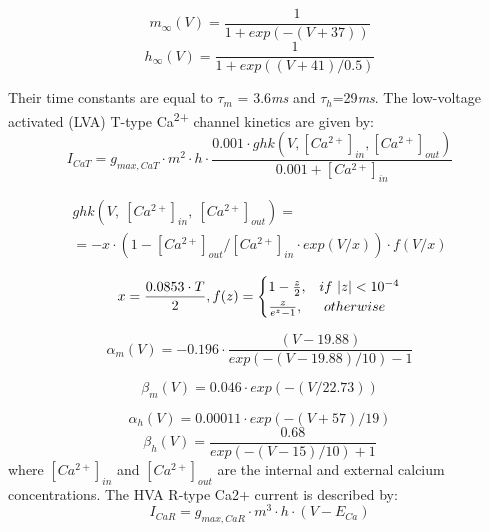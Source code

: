 \documentclass[a4paper,12pt]{article}
\begin{document}
\begin{equation}
m_{\infty}(V)=\frac {1}{1+exp(-(V+37))}
\end{equation}
\begin{equation}
h_{\infty}(V)=\frac {1}{1+exp( (V+41)/0.5)}
\end{equation}

Their time constants are equal to $\tau_m$ = 3.6\textit{ms} and $\tau_h$=29\textit{ms}. The low-voltage activated (LVA) T-type Ca\textsuperscript{2+} channel kinetics are given by:
\begin{equation}
I_{CaT} = g_{max, CaT}\cdot m^2\cdot h \cdot \frac{0.001 \cdot ghk(V,[Ca^{2+}]_{in},[Ca^{2+}]_{out})}{0.001+[Ca^{2+}]_{in} }
\end{equation}

\begin{eqnarray}
ghk(V,\ [Ca^{2+}]_{in},\ [Ca^{2+}]_{out}) = \nonumber \\
= -x\cdot (1 - [Ca^{2+}]_{out}/[Ca^{2+}]_{in} \cdot exp(V/x)) \cdot f(V/x)
\end{eqnarray}

\begin{equation}
x=\frac{0.0853\cdot T}{2}, \\
f(z) = \begin{cases} 1-\frac {z}{2}, & if \ |z|<10^{-4} \\ \frac z{e^z-1}, & \  otherwise \ \end{cases}
\end{equation}

\begin{equation}
\alpha_m(V)=-0.196\cdot \frac{(V-19.88)}{exp(-(V-19.88)/10)-1} 
\end{equation}

\begin{equation}
\beta_m(V) = 0.046\cdot exp(-(V/22.73))
\end{equation}

\begin{equation}
\alpha_h(V)= 0.00011\cdot exp(-(V+57)/19)
\end{equation}
\begin{equation}
\beta_h(V)=\frac {0.68}{exp(-(V-15)/10)+1}
\end{equation}
where $[Ca^{2+}]_{in}$ and $[Ca^{2+}]_{out}$ are the internal and external calcium concentrations. The HVA R-type Ca2+ current is described by:
\begin{equation}
I_{CaR} = g_{max, CaR}\cdot m^3\cdot h\cdot (V-E_{Ca})
\end{equation}
\end{document}
